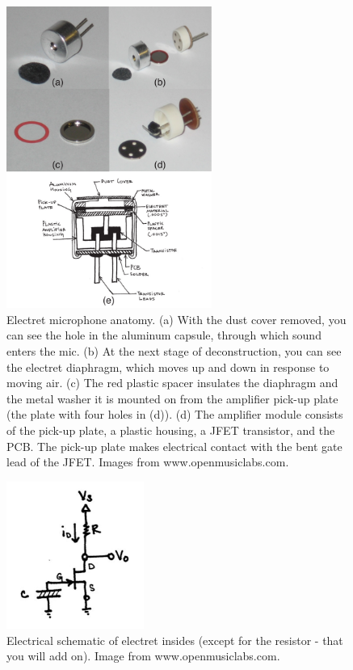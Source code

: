 \documentclass[12pt]{article}
\begin{document}
\begin{enumerate}
\begin{figure}[!h]
\begin{center}
\includegraphics[width=0.6\textwidth,trim=0 0 0 0,clip=false]{electretmicpics.pdf}
\caption{Electret microphone anatomy. (a) With the dust cover removed, you can see the hole in the aluminum capsule, through which sound enters the mic. 
(b) At the next stage of deconstruction, you can see the electret diaphragm, which moves up and down in response to moving air.
(c) The red plastic spacer insulates the diaphragm and the metal washer it is mounted on from the amplifier pick-up plate (the plate with four holes in (d)). 
(d) The amplifier module consists of the pick-up plate, a plastic housing, a JFET transistor, and the PCB. 
The pick-up plate makes electrical contact with the bent gate lead of the JFET.
Images from www.openmusiclabs.com.}
\label{fig:3}
\end{center}
\end{figure}

\begin{figure}[!h]
\begin{center}
\includegraphics[width=0.4\textwidth,trim=0 0 0 0,clip=false]{images/insideelectretschematic.png}
\caption{Electrical schematic of electret insides (except for the resistor - that you will add on).
Image from www.openmusiclabs.com.}
\label{fig:4}
\end{center}
\end{figure}


\end{enumerate}
\end{document}
